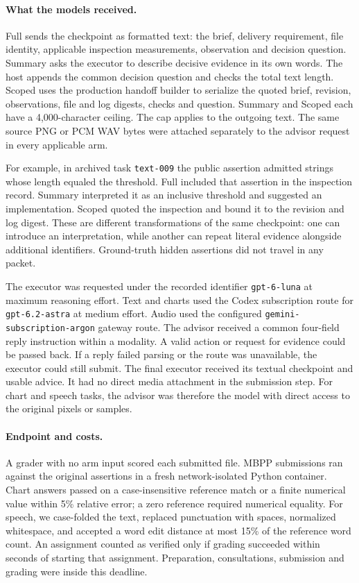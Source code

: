\documentclass[10pt]{article}
\begin{document}
\paragraph{What the models received.}
Full sends the checkpoint as formatted text: the brief, delivery requirement, file identity, applicable inspection measurements, observation and decision question. Summary asks the executor to describe decisive evidence in its own words. The host appends the common decision question and checks the total text length. Scoped uses the production handoff builder to serialize the quoted brief, revision, observations, file and log digests, checks and question. Summary and Scoped each have a 4,000-character ceiling. The cap applies to the outgoing text. The same source PNG or PCM WAV bytes were attached separately to the advisor request in every applicable arm.

For example, in archived task \texttt{text-009} the public assertion admitted strings whose length equaled the threshold. Full included that assertion in the inspection record. Summary interpreted it as an inclusive threshold and suggested an implementation. Scoped quoted the inspection and bound it to the revision and log digest. These are different transformations of the same checkpoint: one can introduce an interpretation, while another can repeat literal evidence alongside additional identifiers. Ground-truth hidden assertions did not travel in any packet.

The executor was requested under the recorded identifier \texttt{gpt-6-luna} at maximum reasoning effort. Text and charts used the Codex subscription route for \texttt{gpt-6.2-astra} at medium effort. Audio used the configured \texttt{gemini-subscription-argon} gateway route. The advisor received a common four-field reply instruction within a modality. A valid action or request for evidence could be passed back. If a reply failed parsing or the route was unavailable, the executor could still submit. The final executor received its textual checkpoint and usable advice. It had no direct media attachment in the submission step. For chart and speech tasks, the advisor was therefore the model with direct access to the original pixels or samples.

\paragraph{Endpoint and costs.}
A grader with no arm input scored each submitted file. MBPP submissions ran against the original assertions in a fresh network-isolated Python container. Chart answers passed on a case-insensitive reference match or a finite numerical value within 5\% relative error; a zero reference required numerical equality. For speech, we case-folded the text, replaced punctuation with spaces, normalized whitespace, and accepted a word edit distance at most 15\% of the reference word count. An assignment counted as verified only if grading succeeded within \Deadline{} seconds of starting that assignment. Preparation, consultations, submission and grading were inside this deadline.
\end{document}
